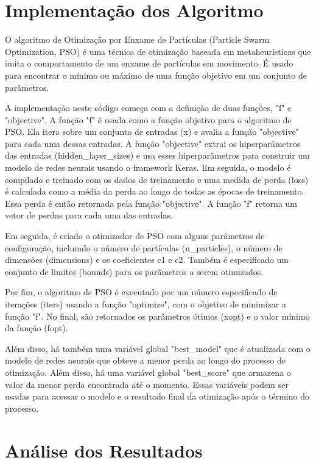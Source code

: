 \documentclass[10pt]{article}
\begin{document}
\section{Implementação dos Algoritmo}\label{sec:imp-al}

O algoritmo de Otimização por Enxame de Partículas 
(Particle Swarm Optimization, PSO) é uma técnica de otimização baseada em 
metaheurísticas que imita o comportamento de um enxame de partículas em 
movimento. É usado para encontrar o mínimo ou máximo de uma função objetivo 
em um conjunto de parâmetros.

A implementação neste código começa com a definição de duas funções, 
"f" e "objective". A função "f" é usada como a função objetivo para o 
algoritmo de PSO. Ela itera sobre um conjunto de entradas (x) e avalia a 
função "objective" para cada uma dessas entradas. A função "objective" 
extrai os hiperparâmetros das entradas (hidden\_layer\_sizes) e usa esses 
hiperparâmetros para construir um modelo de redes neurais usando o framework 
Keras. Em seguida, o modelo é compilado e treinado com os dados de 
treinamento e uma medida de perda (loss) é calculada como a média da perda ao 
longo de todas as épocas de treinamento. Essa perda é então retornada pela 
função "objective". A função "f" retorna um vetor de perdas para cada uma das 
entradas.

Em seguida, é criado o otimizador de PSO com alguns parâmetros de configuração,
incluindo o número de partículas (n\_particles), o número de dimensões 
(dimensions) e os coeficientes c1 e c2. Também é especificado um conjunto de 
limites (bounds) para os parâmetros a serem otimizados.

Por fim, o algoritmo de PSO é executado por um número especificado de 
iterações (iters) usando a função "optimize", com o objetivo de minimizar a 
função "f". No final, são retornados os parâmetros ótimos (xopt) e o valor 
mínimo da função (fopt).

Além disso, há também uma variável global "best\_model" que é 
atualizada com o modelo de redes neurais que obteve a menor perda ao longo 
do processo de otimização. Além disso, há uma variável global "best\_score" 
que armazena o valor da menor perda encontrada até o momento. Essas variáveis 
podem ser usadas para acessar o modelo e o resultado final da otimização após 
o término do processo.

\section{Análise dos Resultados}\label{sec:anal-res}
\end{document}
